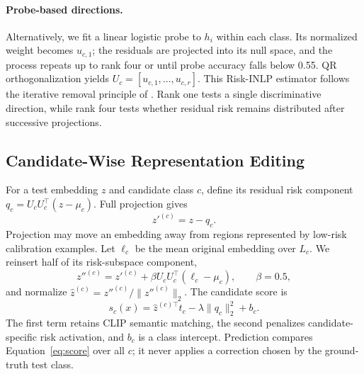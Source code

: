 \paragraph{Probe-based directions.}
Alternatively, we fit a linear logistic probe to $h_i$ within each class. Its normalized weight becomes $u_{c,1}$; the residuals are projected into its null space, and the process repeats up to rank four or until probe accuracy falls below 0.55. QR orthogonalization yields $U_c=[u_{c,1},\ldots,u_{c,r}]$. This Risk-INLP estimator follows the iterative removal principle of \citet{ravfogel2020inlp}. Rank one tests a single discriminative direction, while rank four tests whether residual risk remains distributed after successive projections.

\subsection{Candidate-Wise Representation Editing}
For a test embedding $z$ and candidate class $c$, define its residual risk component $q_c=U_cU_c^\top(z-\mu_c)$. Full projection gives
\begin{equation}
 z'^{(c)}=z-q_c.
\label{eq:projection}
\end{equation}
Projection may move an embedding away from regions represented by low-risk calibration examples. Let $\ell_c$ be the mean original embedding over $L_c$. We reinsert half of its risk-subspace component,
\begin{equation}
 z''^{(c)}=z'^{(c)}+\beta U_cU_c^\top(\ell_c-\mu_c),
 \qquad \beta=0.5,
 \end{equation}
and normalize $\hat z^{(c)}=z''^{(c)}/\|z''^{(c)}\|_2$. The candidate score is
\begin{equation}
 s_c(x)=\hat z^{(c)\top}t_c-\lambda\|q_c\|_2^2+b_c.
 \label{eq:score}
\end{equation}
The first term retains CLIP semantic matching, the second penalizes candidate-specific risk activation, and $b_c$ is a class intercept. Prediction compares Equation~\ref{eq:score} over all $c$; it never applies a correction chosen by the ground-truth test class.


